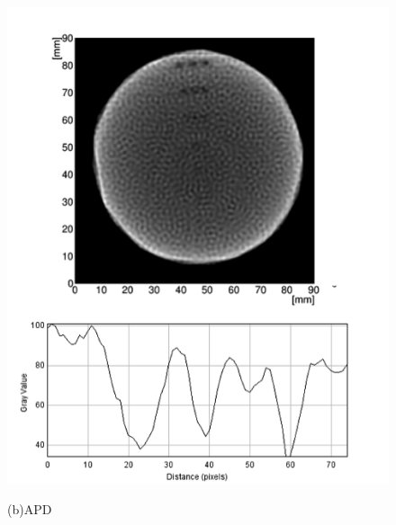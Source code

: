 \begin{figure}[H]
\begin{minipage}{0.52\hsize}
\begin{center}
   \includegraphics[bb=0.000000 0.000000 234.220638 292.775797,width=1.1\hsize]{image2/chapter5/spatial_APD.png}
  \end{center}  
\vspace{-0.3cm}\hspace{3.5cm}
   (b)APD
 \end{minipage}
   \begin{minipage}{0.5\hsize}
  \begin{center}

\end{center}
\end{minipage}
\end{figure}
